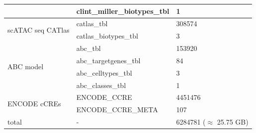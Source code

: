 \begin{table}[h!]
\begin{tabular}{l|l|l}
                                                   & clint\_miller\_biotypes\_tbl       & 1                                                                                                   \\ \hline
        \multirow{2}{*}{scATAC seq CATlas}         & catlas\_tbl                        & 308574                                                                                              \\
                                                   & catlas\_biotypes\_tbl              & 3                                                                                                   \\ \hline
        \multirow{4}{*}{ABC model}                 & abc\_tbl                           & 153920                                                                                              \\
                                                   & abc\_targetgenes\_tbl              & 84                                                                                                  \\
                                                   & abc\_celltypes\_tbl                & 3                                                                                                   \\
                                                   & abc\_classes\_tbl                  & 1                                                                                                   \\ \hline
        \multirow{2}{*}{ENCODE cCREs}              & ENCODE\_CCRE                       & 4451476                                                                                             \\
                                                   & ENCODE\_CCRE\_META                 & 107                                                                                                 \\ \hline
        total                                      & -                                  & 6284781 ($\approx$ 25.75 GB)
        \end{tabular}
    \end{table}

